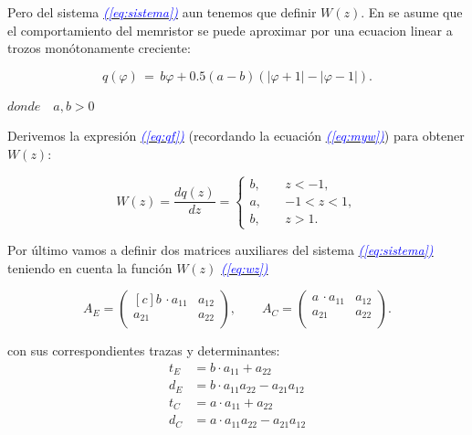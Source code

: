 \documentclass[12pt,a4paper]{report} %
\newcommand{\eref}[1]{\hyperref[#1]{\textcolor{blue}{\textit{(\ref*{#1})}}}}
\begin{document}
	Pero del sistema \eref{eq:sistema} aun tenemos que definir $W(z)$. En \cite{chuaoscillator2008} se asume que el comportamiento del memristor se puede aproximar por una ecuacion linear a trozos monótonamente creciente:
	
	\begin{equation}
		q(\varphi)\,=\,b\varphi+0.5(a-b)(|\varphi+1|-|\varphi-1|).
		\label{eq:qf}
	\end{equation}
    \begin{center}
    	$ donde \quad a,b> 0$
    \end{center}
    
    Derivemos la expresión \eref{eq:qf} (recordando la ecuación \eref{eq:myw}) para obtener $W(z)$:

    
    \begin{equation}
    	W(z) = \frac{dq(z)}{dz} =
    	\begin{cases}
    			b,  \quad & z < -1, \\
    			a,  \quad & -1 < z < 1, \\
    			b,  \quad & z > 1.
    	\end{cases}
    	\label{eq:wz}
    \end{equation}
    
    Por último vamos a definir dos matrices auxiliares del sistema \eref{eq:sistema} teniendo en cuenta la función $W(z)$ \eref{eq:wz}
    
    \begin{equation}
    	A_E=\begin{pmatrix*}[c]
    		b \, \cdotp a_{11} & a_{12}\\
    	             a_{21} & a_{22}\\
    	\end{pmatrix*}, \qquad 	A_C=\begin{pmatrix*}
    	a \, \cdotp a_{11} & a_{12}\\
    	a_{21} & a_{22}\\
    	\end{pmatrix*}.
    \end{equation}\smallskip
    
    con sus correspondientes trazas y determinantes:
    \begin{equation}
    \begin{aligned}
    	t_E &= b \cdot a_{11} + a_{22}\\
    	d_E &= b \cdot a_{11}a_{22} - a_{21}a_{12}\\
    	t_C &= a \cdot a_{11} + a_{22}\\
    	d_C &= a \cdot a_{11}a_{22} - a_{21}a_{12}\\
    \end{aligned}
    \end{equation}\smallskip
    
\end{document}
